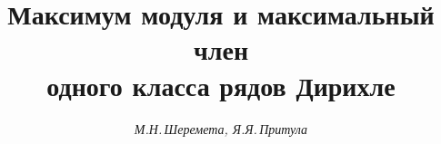 

  




 


\newcommand{\A}{{\cal A}}  


\newcommand{\re}{\operatorname{Re}}  


\newcommand{\const}{\operatorname{const}}  


\newcommand{\tts}[1]{} 


  




  


\setcounter{page}{77}  












\author{\it М.Н.\,Шеремета, Я.Я.\,Притула}  




\title{Максимум модуля и максимальный член\\ 


одного класса рядов Дирихле}  


  


\date{}  




  


\pagestyle{plain} %


  


  




